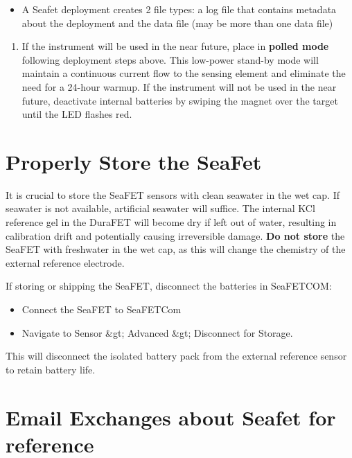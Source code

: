 \documentclass[]{book}
\providecommand{\tightlist}{%
  \setlength{\itemsep}{0pt}\setlength{\parskip}{0pt}}
\begin{document}
\begin{itemize}
\tightlist
\item
  A Seafet deployment creates 2 file types: a log file that contains metadata about the deployment and the data file (may be more than one data file)
\end{itemize}

\begin{enumerate}
\def\labelenumi{\arabic{enumi}.}
\setcounter{enumi}{5}
\tightlist
\item
  If the instrument will be used in the near future, place in \textbf{polled mode} following deployment steps above. This low-power stand-by mode will maintain a continuous current flow to the sensing element and eliminate the need for a 24-hour warmup. If the instrument will not be used in the near future, deactivate internal batteries by swiping the magnet over the target until the LED flashes red.
\end{enumerate}

\hypertarget{properly-store-the-seafet}{%
\section{Properly Store the SeaFet}\label{properly-store-the-seafet}}

It is crucial to store the SeaFET sensors with clean seawater in the wet cap. If seawater is not available, artificial seawater will suffice. The internal KCl reference gel in the DuraFET will become dry if left out of water, resulting in calibration drift and potentially causing irreversible damage. \textbf{Do not store} the SeaFET with freshwater in the wet cap, as this will change the chemistry of the external reference electrode.

If storing or shipping the SeaFET, disconnect the batteries in SeaFETCOM:

\begin{itemize}
\tightlist
\item
  Connect the SeaFET to SeaFETCom
\item
  Navigate to Sensor \&gt; Advanced \&gt; Disconnect for Storage.
\end{itemize}

This will disconnect the isolated battery pack from the external reference sensor to retain battery life.

\hypertarget{email-exchanges-about-seafet-for-reference}{%
\section{Email Exchanges about Seafet for reference}\label{email-exchanges-about-seafet-for-reference}}
\end{document}

